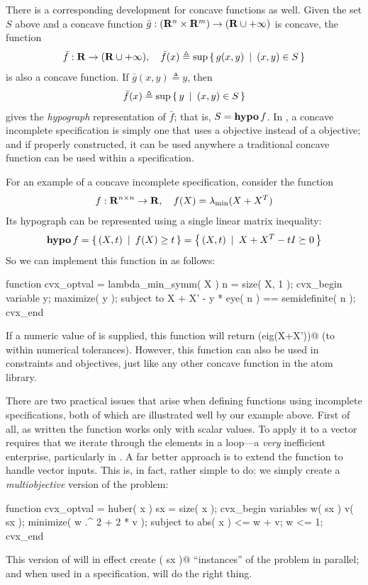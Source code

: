 \documentclass[12pt]{article}
\begin{document}
There is a corresponding development for concave functions as well.
Given the set
$S$ above and a concave function
$\bar{g}:(\R^n\times\R^m)\rightarrow(\R\cup+\infty)$ is
concave, the function
\begin{equation}
	\label{eq:partial2}
	\bar{f}:\R\rightarrow(\R\cup+\infty), \quad \bar{f}(x) \triangleq \sup\Condset{g(x,y)}{(x,y)\in S }
\end{equation}
is also a concave function.
If $\bar{g}(x,y)\triangleq y$, then
\begin{equation}
	\bar{f}(x) \triangleq \sup\left\{\,y\,~|~\,(x,y)\in S\,\right\}
\end{equation}
gives the \emph{hypograph} representation of $\bar{f}$; that is, $S=\operatorname{\textbf{hypo}} f$.
In \cvx, a concave incomplete specification is simply one that
uses a \verb@maximize@ objective instead of a \verb@minimize@ objective;
and if properly constructed, it can be used anywhere a traditional
concave function can be used within a \cvx specification. 

For an example of a concave incomplete specification, consider the function
\begin{equation}
	f:\R^{n\times n}\rightarrow\R, \quad f(X) = \lambda_{\min}(X+X^T)
\end{equation}
Its hypograph can be represented using a single linear matrix inequality:
\begin{equation}
	\operatorname{\textbf{hypo}} f = \left\{\, (X,t) \,~|~\, f(X) \geq t \,\right\} = \left\{\, (X,t) \,~|~\, X + X^T - t I \succeq 0 \,\right\}
\end{equation}
So we can implement this function in \cvx as follows:
\begin{code}
	function cvx_optval = lambda_min_symm( X )
	n = size( X, 1 );
	cvx_begin
	    variable y;
	    maximize( y );
	    subject to
	        X + X' - y * eye( n ) == semidefinite( n );
	cvx_end
\end{code}
If a numeric value of \verb@X@ is supplied, this function will return
\verb@min(eig(X+X'))@ (to within numerical tolerances). However, this function
can also be used in \cvx constraints and objectives, just like any other concave
function in the atom library.

There are two practical issues that arise when defining functions
using incomplete specifications, both of which are illustrated well by
our \verb@huber@ example above. First of all, as written the function works
only with scalar values. To apply it to a vector requires that we iterate
through the elements in a \verb@for@ loop---a \emph{very} inefficient enterprise,
particularly in \cvx. A far better 
approach is to extend the \verb@huber@ function to handle vector inputs. This
is, in fact, rather simple to do: we simply create a \emph{multiobjective}
version of the problem:
\begin{code}
	function cvx_optval = huber( x )
	sx = size( x );
	cvx_begin
	    variables w( sx ) v( sx );
	    minimize( w .^ 2 + 2 * v );
	    subject to
	        abs( x ) <= w + v;
	        w <= 1;
	cvx_end
\end{code}
This version of \verb@huber@ will in effect create \verb@prod( sx )@ ``instances''
of the problem in parallel; and when used in a \cvx specification,
\cvx will do the right thing.
\end{document}

